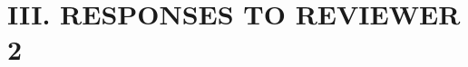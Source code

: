 \documentclass[11pt]{article}
\begin{document}
\newpage

\section*{III. RESPONSES TO REVIEWER 2}



\newpage

\begin{referenceblock}


\end{referenceblock}
\end{document}
